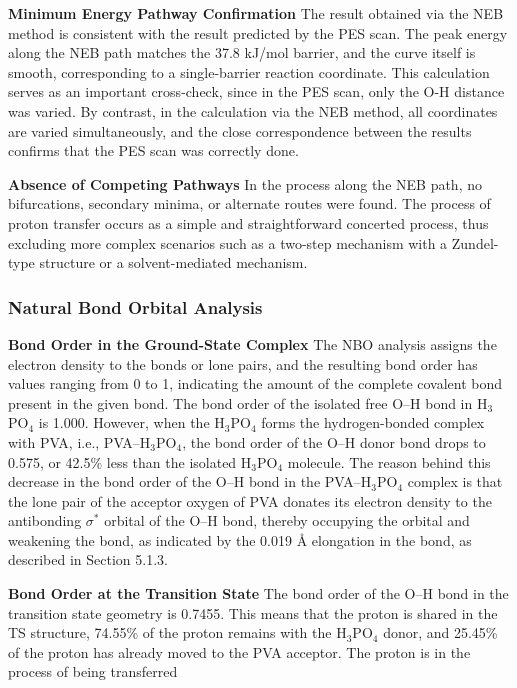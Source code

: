 \documentclass[12pt,a4paper]{report}
\begin{document}
\textbf{Minimum Energy Pathway Confirmation}
The result obtained via the NEB method is consistent with the result predicted by the PES scan. The peak energy along the NEB path matches the 37.8 kJ/mol barrier, and the curve itself is smooth, corresponding to a single-barrier reaction coordinate. This calculation serves as an important cross-check, since in the PES scan, only the O-H distance was varied. By contrast, in the calculation via the NEB method, all coordinates are varied simultaneously, and the close correspondence between the results confirms that the PES scan was correctly done. \cite{89,90,91}

\textbf{Absence of Competing Pathways}
In the process along the NEB path, no bifurcations, secondary minima, or alternate routes were found. The process of proton transfer occurs as a simple and straightforward concerted process, thus excluding more complex scenarios such as a two-step mechanism with a Zundel-type structure or a solvent-mediated mechanism.\cite{61,62}

\subsubsection{Natural Bond Orbital Analysis}

\textbf{Bond Order in the Ground-State Complex}
The NBO analysis assigns the electron density to the bonds or lone pairs, and the resulting bond order has values ranging from 0 to 1, indicating the amount of the complete covalent bond present in the given bond.\cite{84,85} The bond order of the isolated free O–H bond in H\(_3\)PO\(_4\) is 1.000. However, when the H\(_3\)PO\(_4\) forms the hydrogen-bonded complex with PVA, i.e., PVA–H\(_3\)PO\(_4\), the bond order of the O–H donor bond drops to 0.575, or 42.5\% less than the isolated H\(_3\)PO\(_4\) molecule. The reason behind this decrease in the bond order of the O–H bond in the PVA–H\(_3\)PO\(_4\) complex is that the lone pair of the acceptor oxygen of PVA donates its electron density to the antibonding \(\sigma^*\) orbital of the O–H bond, thereby occupying the orbital and weakening the bond, as indicated by the 0.019 Å elongation in the bond, as described in Section 5.1.3. \cite{84, 85, 99}

\textbf{Bond Order at the Transition State}
The bond order of the O–H bond in the transition state geometry is 0.7455. This means that the proton is shared in the TS structure, 74.55\% of the proton remains with the H\(_3\)PO\(_4\) donor, and 25.45\% of the proton has already moved to the PVA acceptor. The proton is in the process of being transferred\cite{84, 85}
\end{document}
